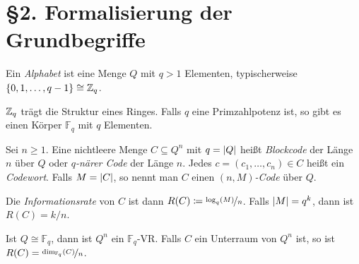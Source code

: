 \documentclass{cheat-sheet}
\newcommand{\F}{\mathbb{F}} %
\begin{document}







\section{§2. Formalisierung der Grundbegriffe}


\begin{defn}
  Ein \emph{Alphabet} ist eine Menge $Q$ mit $q > 1$ Elementen, typischerweise $\{ 0, 1, \ldots, q-1 \} \cong \mathbb{Z}_q$.
\end{defn}

\begin{bem}
  $\mathbb{Z}_q$ trägt die Struktur eines Ringes.
  Falls $q$ eine Primzahlpotenz ist, so gibt es einen Körper $\F_q$ mit $q$ Elementen.
\end{bem}

\begin{defn}
  Sei $n \geq 1$. Eine nichtleere Menge $C \subseteq Q^n$ mit $q = \lvert Q\rvert$ heißt \emph{Blockcode} der Länge $n$ über $Q$ oder \emph{$q$-närer Code} der Länge $n$. Jedes $c = (c_1, \ldots, c_n) \in C$ heißt ein \emph{Codewort}.
  Falls $M = \lvert C\rvert$, so nennt man $C$ einen \emph{$(n, M)$-Code} über $Q$.
\end{defn}

\begin{defn}
  Die \emph{Informationsrate} von $C$ ist dann $R(C) \coloneqq \nicefrac{\log_q(M)}{n}$.
  Falls $\lvert M\rvert = q^k$, dann ist $R(C) = k/n$.
\end{defn}

\begin{bem}
  Ist $Q \cong \F_q$, dann ist $Q^n$ ein $\F_q$-VR. Falls $C$ ein Unterraum von $Q^n$ ist, so ist $R(C) = \nicefrac{\dim_{\F_q}(C)}{n}$.
\end{bem}
\end{document}

